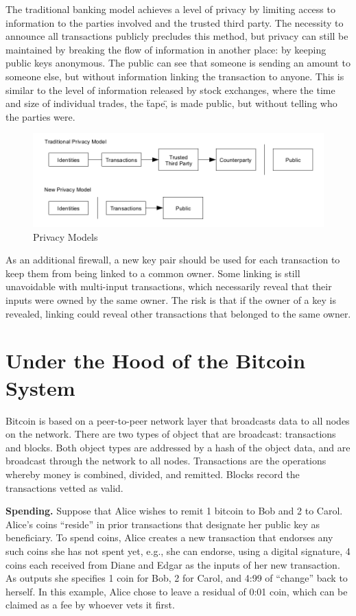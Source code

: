 The traditional banking model achieves a level of privacy by limiting access to information to the parties involved and the trusted third party. The necessity to announce all transactions publicly precludes this method, but privacy can still be maintained by breaking the flow of information in another place: by keeping public keys anonymous. The public can see that someone is sending an amount to someone else, but without information linking the transaction to anyone. This is similar to the level of information released by stock exchanges, where the time and size of individual trades, the \"tape\", is made public, but without telling who the parties were.

\begin{figure}[ht!]
\centering
\includegraphics[trim = 0mm 0mm 0mm 0mm, width=120mm]{images/traditional_privacy_model}
\caption{Privacy Models}
\end{figure}

As an additional firewall, a new key pair should be used for each transaction to keep them from being linked to a common owner. Some linking is still unavoidable with multi-input transactions, which necessarily reveal that their inputs were owned by the same owner. The risk is that if the owner of a key is revealed, linking could reveal other transactions that belonged to the same owner.

\chapter{Under the Hood of the Bitcoin System}

Bitcoin is based on a peer-to-peer network layer that broadcasts data to all nodes on
the network. There are two types of object that are broadcast: transactions and blocks.
Both object types are addressed by a hash of the object data, and are broadcast through
the network to all nodes. Transactions are the operations whereby money is combined,
divided, and remitted. Blocks record the transactions vetted as valid.

\textbf{Spending.} Suppose that Alice wishes to remit 1 bitcoin to Bob and 2 to Carol. Alice’s
coins “reside” in prior transactions that designate her public key as beneficiary. To spend
coins, Alice creates a new transaction that endorses any such coins she has not spent
yet, e.g., she can endorse, using a digital signature, 4 coins each received from Diane
and Edgar as the inputs of her new transaction. As outputs she specifies 1 coin for Bob,
2 for Carol, and 4:99 of “change” back to herself. In this example, Alice chose to leave
a residual of 0:01 coin, which can be claimed as a fee by whoever vets it first\cite{barber2012bitter}.

